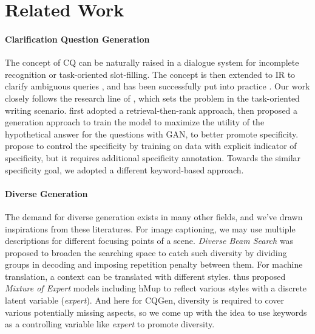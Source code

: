 \section{Related Work}
\paragraph{Clarification Question Generation} The concept of CQ can be naturally raised in a dialogue system for incomplete recognition \citep{stoyanchev2014towards} or task-oriented slot-filling. The concept is then extended to IR to clarify ambiguous queries \citep{aliannejadi2019asking}, and has been successfully put into practice \citep{Zamani2020GeneratingCQ}. Our work closely follows the research line of \citet{rao2018learning, rao2019answer, cao2019controlling}, which sets the problem in the task-oriented writing scenario. \citet{rao2018learning} first adopted a retrieval-then-rank approach, \citet{rao2019answer} then proposed a generation approach to train the model to maximize the utility of the hypothetical answer for the questions with GAN, to better promote specificity. \citet{cao2019controlling} propose to control the specificity by training on data with explicit indicator of specificity, but it requires additional specificity annotation. Towards the similar specificity goal, we adopted a different keyword-based approach.

\paragraph{Diverse Generation} The demand for diverse generation exists in many other fields, and we've drawn inspirations from these literatures. For image captioning, we may use multiple descriptions for different focusing points of a scene. \textit{Diverse Beam Search} \citep{vijayakumar2018diverse} was proposed to broaden the searching space to catch such diversity by dividing groups in decoding and imposing repetition penalty between them. For machine translation, a context can be translated with different styles. \citet{shen2019mixture} thus proposed \textit{Mixture of Expert} models including hMup to reflect various styles with a discrete latent variable (\textit{expert}). And here for CQGen, diversity is required to cover various potentially missing aspects, so we come up with the idea to use keywords as a controlling variable  like \textit{expert} to promote diversity.

